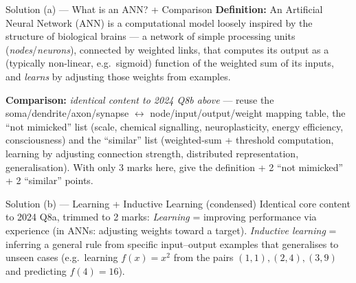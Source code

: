 \documentclass[12pt,a4paper]{article}
\begin{document}
\begin{solbox}{Solution (a) --- What is an ANN? + Comparison}
\textbf{Definition:} An Artificial Neural Network (ANN) is a computational model loosely inspired by the structure of biological brains --- a network of simple processing units (\emph{nodes}/\emph{neurons}), connected by weighted links, that computes its output as a (typically non-linear, e.g.\ sigmoid) function of the weighted sum of its inputs, and \emph{learns} by adjusting those weights from examples.

\textbf{Comparison:} \emph{identical content to 2024 Q8b above} --- reuse the soma/dendrite/axon/synapse $\leftrightarrow$ node/input/output/weight mapping table, the ``not mimicked'' list (scale, chemical signalling, neuroplasticity, energy efficiency, consciousness) and the ``similar'' list (weighted-sum + threshold computation, learning by adjusting connection strength, distributed representation, generalisation). With only 3 marks here, give the definition + 2 ``not mimicked'' + 2 ``similar'' points.
\end{solbox}

\begin{solbox}{Solution (b) --- Learning + Inductive Learning (condensed)}
Identical core content to 2024 Q8a, trimmed to 2 marks: \emph{Learning} = improving performance via experience (in ANNs: adjusting weights toward a target). \emph{Inductive learning} = inferring a general rule from specific input--output examples that generalises to unseen cases (e.g.\ learning $f(x)=x^2$ from the pairs $(1,1),(2,4),(3,9)$ and predicting $f(4)=16$).
\end{solbox}
\end{document}
